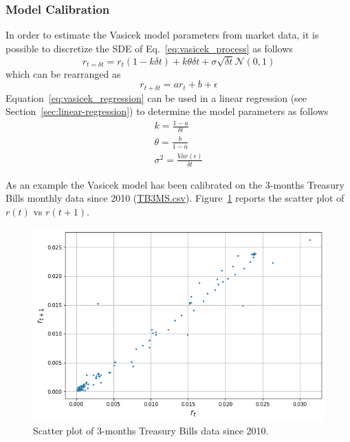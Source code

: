 \subsubsection{Model Calibration}
In order to estimate the Vasicek model parameters from market data, it is possible to discretize the SDE of Eq.~\ref{eq:vasicek_process} as follows
\begin{equation*}
r_{t=\delta t} = r_t (1-k\delta t) + k\theta\delta t + \sigma \sqrt{\delta t}\mathcal{N}(0,1)
\end{equation*}
which can be rearranged as
\begin{equation}
r_{t+\delta t} = ar_t + b + \epsilon
\label{eq:vasicek_regression}
\end{equation}
Equation~\ref{eq:vasicek_regression} can be used in a linear regression (see Section~\ref{sec:linear-regression}) to determine the model parameters as follows
\begin{equation}
\begin{gathered}
k = \frac{1-a}{\delta t} \\
\theta = \frac{b}{1-a} \\
\sigma^2 = \frac{Var(\epsilon)}{\delta t}
\end{gathered}
\label{eq:vasicek_parameters_estimate}
\end{equation}

As an example the Vasicek model has been calibrated on the 3-months Treasury Bills monthly data since 2010 (\href{https://raw.githubusercontent.com/matteosan1/finance_course/develop/input_files/TB3MS.csv}{TB3MS.csv}). Figure~\ref{fig:TB3MS} reports the scatter plot of $r(t)$ vs $r(t+1)$.

\begin{figure}[htb]
\centering
\includegraphics[width=0.7\linewidth]{figures/TB3MS}
\caption{Scatter plot of 3-months Treasury Bills data since 2010.}
\label{fig:TB3MS}
\end{figure}

